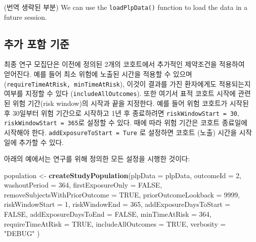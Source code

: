 \documentclass[11pt]{book}
\newenvironment{Shaded}{\begin{snugshade}}{\end{snugshade}}
\newcommand{\KeywordTok}[1]{\textcolor[rgb]{0.13,0.29,0.53}{\textbf{#1}}}
\newcommand{\DataTypeTok}[1]{\textcolor[rgb]{0.13,0.29,0.53}{#1}}
\newcommand{\DecValTok}[1]{\textcolor[rgb]{0.00,0.00,0.81}{#1}}
\newcommand{\StringTok}[1]{\textcolor[rgb]{0.31,0.60,0.02}{#1}}
\newcommand{\OtherTok}[1]{\textcolor[rgb]{0.56,0.35,0.01}{#1}}
\newcommand{\NormalTok}[1]{#1}
\theoremstyle{definition}
\theoremstyle{definition}
\theoremstyle{definition}
\theoremstyle{remark}
\begin{document}
(번역 생략된 부분) We can use the \texttt{loadPlpData()} function to
load the data in a future session.

\subsection{추가 포함 기준}\label{--}

최종 연구 모집단은 이전에 정의된 2개의 코호트에서 추가적인 제약조건을
적용하여 얻어진다. 예를 들어 최소 위험에 노출된 시간을 적용할 수 있으며
(\texttt{requireTimeAtRisk,\ minTimeAtRisk}), 이것이 결과를 가진
환자에게도 적용되는지 여부를 지정할 수 있다
(\texttt{includeAllOutcomes}). 또한 여기서 표적 코호트 시작에 관련된
위험 기간(risk window)의 시작과 끝을 지정한다. 예를 들어 위험 코호트가
시작된 후 30일부터 위험 기간으로 시작하고 1년 후 종료하려면
\texttt{riskWindowStart\ =\ 30}, \texttt{riskWindowStart\ =\ 365}로
설정할 수 있다. 때에 따라 위험 기간은 코호트 종료일에 시작해야 한다.
\texttt{addExposureToStart\ =\ Ture} 로 설정하면 코호트 (노출) 시간을
시작일에 추가할 수 있다.

아래의 예에서는 연구를 위해 정의한 모든 설정을 시행한 것이다:

\begin{Shaded}
\begin{Highlighting}[]
\NormalTok{population <-}\StringTok{ }\KeywordTok{createStudyPopulation}\NormalTok{(}\DataTypeTok{plpData =}\NormalTok{ plpData,}
                                    \DataTypeTok{outcomeId =} \DecValTok{2}\NormalTok{,}
                                    \DataTypeTok{washoutPeriod =} \DecValTok{364}\NormalTok{,}
                                    \DataTypeTok{firstExposureOnly =} \OtherTok{FALSE}\NormalTok{,}
                                    \DataTypeTok{removeSubjectsWithPriorOutcome =} \OtherTok{TRUE}\NormalTok{,}
                                    \DataTypeTok{priorOutcomeLookback =} \DecValTok{9999}\NormalTok{,}
                                    \DataTypeTok{riskWindowStart =} \DecValTok{1}\NormalTok{,}
                                    \DataTypeTok{riskWindowEnd =} \DecValTok{365}\NormalTok{,}
                                    \DataTypeTok{addExposureDaysToStart =} \OtherTok{FALSE}\NormalTok{,}
                                    \DataTypeTok{addExposureDaysToEnd =} \OtherTok{FALSE}\NormalTok{,}
                                    \DataTypeTok{minTimeAtRisk =} \DecValTok{364}\NormalTok{,}
                                    \DataTypeTok{requireTimeAtRisk =} \OtherTok{TRUE}\NormalTok{,}
                                    \DataTypeTok{includeAllOutcomes =} \OtherTok{TRUE}\NormalTok{,}
                                    \DataTypeTok{verbosity =} \StringTok{"DEBUG"}
\NormalTok{)}
\end{Highlighting}
\end{Shaded}
\end{document}
